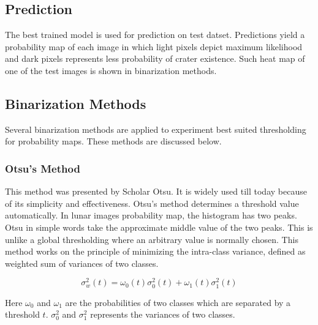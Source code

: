 \documentclass[11pt]{article}
\begin{document}
\subsection{Prediction}
The best trained model is used for prediction on test datset. Predictions yield a probability map of each image in which light pixels depict maximum likelihood and dark pixels represents less probability of crater existence. Such heat map of one of the test images is shown in binarization methods.


\subsection{Binarization Methods}
Several binarization methods are applied to experiment best suited thresholding for probability maps. These methods are discussed below.

\subsubsection{Otsu's Method}
This method was presented by Scholar Otsu. It is widely used till today because of its simplicity and effectiveness. Otsu's method determines a threshold value automatically. In lunar images probability map, the histogram has two peaks. Otsu in simple words take the approximate middle value of the two peaks. This is unlike a global thresholding where an arbitrary value is normally chosen. This method works on the principle of minimizing the intra-class variance, defined as weighted sum of variances of two classes.

\begin{equation}
\sigma_{w}^{2}(t)=\omega_{0}(t) \sigma_{0}^{2}(t)+\omega_{1}(t) \sigma_{1}^{2}(t)
\end{equation}

Here $\omega_{0}$ and $\omega_{1}$ are the probabilities of two classes which are separated by a threshold $t$. $\sigma_{0}^{2}$ and $\sigma_{1}^{2}$ represents the variances of two classes.
\end{document}
